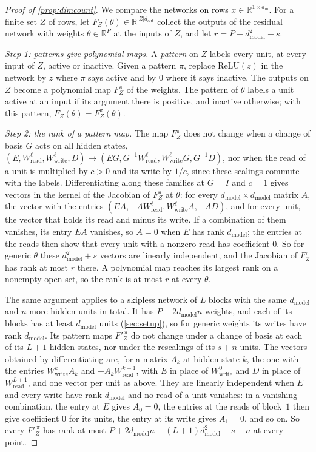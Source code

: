 \documentclass[10pt]{article}
\theoremstyle{definition}
\theoremstyle{remark}
\newcommand{\R}{\mathbb{R}}
\newcommand{\Wread}{W_{\mathrm{read}}}
\newcommand{\Wwrite}{W_{\mathrm{write}}}
\newcommand{\dm}{d_{\mathrm{model}}}
\begin{document}
\begin{proof}[Proof of \cref{prop:dimcount}]
We compare the networks on rows $x \in \R^{1\times d_{\mathrm{in}}}$. For a finite set $Z$ of rows, let $F_Z(\theta) \in \R^{\lvert Z\rvert d_{\mathrm{out}}}$ collect the outputs of the residual network with weights $\theta \in \R^P$ at the inputs of $Z$, and let $r = P - \dm^2 - s$.

\emph{Step 1: patterns give polynomial maps.} A \emph{pattern} on $Z$ labels every unit, at every input of $Z$, active or inactive. Given a pattern $\pi$, replace $\mathrm{ReLU}(z)$ in the network by $z$ where $\pi$ says active and by $0$ where it says inactive. The outputs on $Z$ become a polynomial map $F_Z^\pi$ of the weights. The pattern of $\theta$ labels a unit active at an input if its argument there is positive, and inactive otherwise; with this pattern, $F_Z(\theta) = F_Z^\pi(\theta)$.

\emph{Step 2: the rank of a pattern map.} The map $F_Z^\pi$ does not change when a change of basis $G$ acts on all hidden states, $(E, \Wread^{\ell}, \Wwrite^{\ell}, D) \mapsto (EG, G^{-1}\Wread^{\ell}, \Wwrite^{\ell}G, G^{-1}D)$, nor when the read of a unit is multiplied by $c > 0$ and its write by $1/c$, since these scalings commute with the labels. Differentiating along these families at $G = I$ and $c = 1$ gives vectors in the kernel of the Jacobian of $F_Z^\pi$ at $\theta$: for every $\dm\times\dm$ matrix $A$, the vector with the entries $(EA, -A\Wread^{\ell}, \Wwrite^{\ell}A, -AD)$, and for every unit, the vector that holds its read and minus its write. If a combination of them vanishes, its entry $EA$ vanishes, so $A = 0$ when $E$ has rank $\dm$; the entries at the reads then show that every unit with a nonzero read has coefficient $0$. So for generic $\theta$ these $\dm^2 + s$ vectors are linearly independent, and the Jacobian of $F_Z^\pi$ has rank at most $r$ there. A polynomial map reaches its largest rank on a nonempty open set, so the rank is at most $r$ at every $\theta$.

The same argument applies to a skipless network of $L$ blocks with the same $\dm$ and $n$ more hidden units in total. It has $P + 2\dm n$ weights, and each of its blocks has at least $\dm$ units (\cref{sec:setup}), so for generic weights its writes have rank $\dm$. Its pattern maps $F'^{\,\pi}_Z$ do not change under a change of basis at each of its $L + 1$ hidden states, nor under the rescalings of its $s + n$ units. The vectors obtained by differentiating are, for a matrix $A_k$ at hidden state $k$, the one with the entries $\Wwrite^{k}A_k$ and $-A_k\Wread^{k+1}$, with $E$ in place of $\Wwrite^{0}$ and $D$ in place of $\Wread^{L+1}$, and one vector per unit as above. They are linearly independent when $E$ and every write have rank $\dm$ and no read of a unit vanishes: in a vanishing combination, the entry at $E$ gives $A_0 = 0$, the entries at the reads of block~$1$ then give coefficient $0$ for its units, the entry at its write gives $A_1 = 0$, and so on. So every $F'^{\,\pi}_Z$ has rank at most $P + 2\dm n - (L+1)\dm^2 - s - n$ at every point.


\end{proof}
\end{document}
